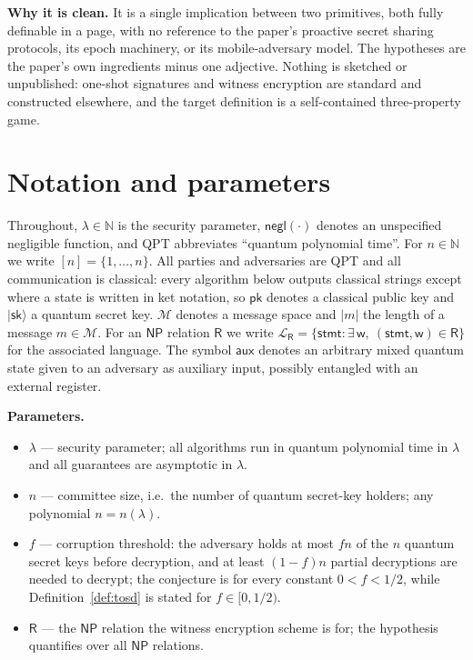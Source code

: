 \documentclass{conjura-conjecture}
\newcommand{\ket}[1]{\lvert #1 \rangle}
\newcommand{\negl}{\mathsf{negl}}
\newcommand{\NP}{\mathsf{NP}}
\newcommand{\Rel}{\mathsf{R}}
\newcommand{\Msp}{\mathcal{M}}
\newcommand{\Lang}{\mathcal{L}}
\newcommand{\pk}{\mathsf{pk}}
\newcommand{\sk}{\mathsf{sk}}
\newcommand{\stmt}{\mathsf{stmt}}
\newcommand{\wit}{\mathsf{w}}
\newcommand{\aux}{\mathsf{aux}}
\begin{document}
\textbf{Why it is clean.} It is a single implication between two
primitives, both fully definable in a page, with no reference to the
paper's proactive secret sharing protocols, its epoch machinery, or
its mobile-adversary model. The hypotheses are the paper's own
ingredients minus one adjective. Nothing is sketched or unpublished:
one-shot signatures and witness encryption are standard and
constructed elsewhere, and the target definition is a self-contained
three-property game.

\section{Notation and parameters}\label{sec:notation}

Throughout, $\lambda \in \mathbb{N}$ is the security parameter,
$\negl(\cdot)$ denotes an unspecified negligible function, and QPT
abbreviates ``quantum polynomial time''. For $n \in \mathbb{N}$ we
write $[n] = \{1, \dots, n\}$. All parties and adversaries are QPT and
all communication is classical: every algorithm below outputs
classical strings except where a state is written in ket notation, so
$\pk$ denotes a classical public key and $\ket{\sk}$ a quantum secret
key. $\Msp$ denotes a message space and $\lvert m \rvert$ the length
of a message $m \in \Msp$. For an $\NP$ relation $\Rel$ we write
$\Lang_{\Rel} = \{\stmt : \exists\, \wit,\ (\stmt, \wit) \in \Rel\}$
for the associated language. The symbol $\aux$ denotes an arbitrary
mixed quantum state given to an adversary as auxiliary input, possibly
entangled with an external register.

\textbf{Parameters.}
\begin{itemize}[leftmargin=1.2em]
\item $\lambda$ --- security parameter; all algorithms run in quantum
  polynomial time in $\lambda$ and all guarantees are asymptotic in
  $\lambda$.
\item $n$ --- committee size, i.e.\ the number of quantum secret-key
  holders; any polynomial $n = n(\lambda)$.
\item $f$ --- corruption threshold: the adversary holds at most $fn$
  of the $n$ quantum secret keys before decryption, and at least
  $(1-f)n$ partial decryptions are needed to decrypt; the conjecture
  is for every constant $0 < f < 1/2$, while
  Definition~\ref{def:tosd} is stated for $f \in [0, 1/2)$.
\item $\Rel$ --- the $\NP$ relation the witness encryption scheme is
  for; the hypothesis quantifies over all $\NP$ relations.
\end{itemize}
\end{document}
